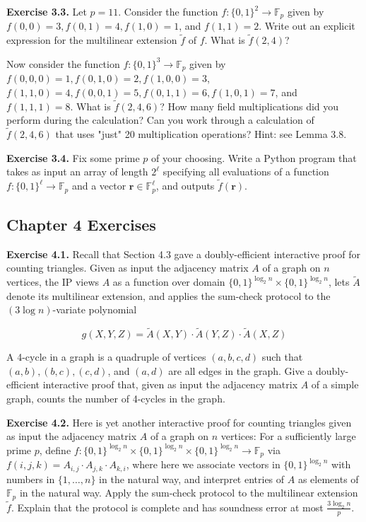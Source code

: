 \documentclass{article}
\begin{document}
\textbf{Exercise 3.3.} Let $p=11$. Consider the function $f:\{0,1\}^2 \rightarrow \mathbb{F}_p$ given by $f(0,0)=3, f(0,1)=4, f(1,0)=1$, and $f(1,1)=2$. Write out an explicit expression for the multilinear extension $\tilde{f}$ of $f$. What is $\tilde{f}(2,4)$?

Now consider the function $f:\{0,1\}^3 \rightarrow \mathbb{F}_p$ given by $f(0,0,0)=1, f(0,1,0)=2, f(1,0,0)=3$, $f(1,1,0)=4, f(0,0,1)=5, f(0,1,1)=6, f(1,0,1)=7$, and $f(1,1,1)=8$. What is $\tilde{f}(2,4,6)$? How many field multiplications did you perform during the calculation? Can you work through a calculation of $\tilde{f}(2,4,6)$ that uses "just" 20 multiplication operations? Hint: see Lemma 3.8.

\textbf{Exercise 3.4.} Fix some prime $p$ of your choosing. Write a Python program that takes as input an array of length $2^{\ell}$ specifying all evaluations of a function $f:\{0,1\}^{\ell} \rightarrow \mathbb{F}_p$ and a vector $\mathbf{r} \in \mathbb{F}_p^{\ell}$, and outputs $\tilde{f}(\mathbf{r})$.

\subsection{Chapter 4 Exercises}

\textbf{Exercise 4.1.} Recall that Section 4.3 gave a doubly-efficient interactive proof for counting triangles. Given as input the adjacency matrix $A$ of a graph on $n$ vertices, the IP views $A$ as a function over domain $\{0,1\}^{\log_2 n} \times \{0,1\}^{\log_2 n}$, lets $\widetilde{A}$ denote its multilinear extension, and applies the sum-check protocol to the $(3 \log n)$-variate polynomial

\[
g(X, Y, Z) = \widetilde{A}(X, Y) \cdot \widetilde{A}(Y, Z) \cdot \widetilde{A}(X, Z)
\]

A 4-cycle in a graph is a quadruple of vertices $(a, b, c, d)$ such that $(a, b),(b, c),(c, d)$, and $(a, d)$ are all edges in the graph. Give a doubly-efficient interactive proof that, given as input the adjacency matrix $A$ of a simple graph, counts the number of 4-cycles in the graph.

\textbf{Exercise 4.2.} Here is yet another interactive proof for counting triangles given as input the adjacency matrix $A$ of a graph on $n$ vertices: For a sufficiently large prime $p$, define $f:\{0,1\}^{\log_2 n} \times \{0,1\}^{\log_2 n} \times \{0,1\}^{\log_2 n} \rightarrow \mathbb{F}_p$ via $f(i, j, k) = A_{i,j} \cdot A_{j,k} \cdot A_{k,i}$, where here we associate vectors in $\{0,1\}^{\log_2 n}$ with numbers in $\{1, \ldots, n\}$ in the natural way, and interpret entries of $A$ as elements of $\mathbb{F}_p$ in the natural way. Apply the sum-check protocol to the multilinear extension $\widetilde{f}$. Explain that the protocol is complete and has soundness error at most $\frac{3 \log_2 n}{p}$.
\end{document}
